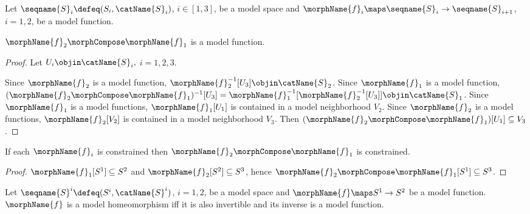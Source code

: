 \documentclass{article}
\begin{document}
\begin{lemma}
\label{lem:modcomp}
Let $\seqname{S}_i \defeq (S_i,\catName{S}_i)$, $i \in [1,3]$, be a
model space and
$\morphName{f}_i \maps \seqname{S}_i \to \seqname{S}_{i+1}$, $i=1,2$, be
a model function.

$\morphName{f}_2 \morphCompose \morphName{f}_1$ is a model function.

\begin{proof}
Let $U_i \objin \catName{S}_i,$ $i=1,2,3$.

Since $\morphName{f}_2$ is a model function,
\nobreaks
  {{
    $\morphName{f}^{-1}_2[U_3] \objin \catName{S}_2$.
  }}
Since $\morphName{f}_1$ is a model function,
$
  (\morphName{f}_2 \morphCompose \morphName{f}_1)^{-1}[U_3]
  =
  \morphName{f}^{-1}_1[\morphName{f}^{-1}_2[U_3]]
  \objin
  \catName{S}_1
$.
Since $\morphName{f}_1$ is a model functions, $\morphName{f}_1[U_1]$
is contained in a model neighborhood $V_2$.
Since $\morphName{f}_2$ is a model functions, $\morphName{f}_2[V_2]$
is contained in a model neighborhood $V_3$.
Then $(\morphName{f}_2 \morphCompose \morphName{f}_1)[U_1] \subseteq V_3$.
\end{proof}

If each $\morphName{f}_i$ is constrained then
$\morphName{f}_2 \morphCompose \morphName{f}_1$ is constrained.

\begin{proof}
$\morphName{f}_1[S^1] \subseteq S^2$ and
$\morphName{f}_2[S^2] \subseteq S^3$, hence
$\morphName{f}_2 \morphCompose \morphName{f}_1[S^1] \subseteq S^3$.
\end{proof}
\end{lemma}

\begin{definition}
\label{def:modelhomeo}
Let $\seqname{S}^i \defeq (S^i, \catName{S}^i)$, $i=1,2$, be a model
space and $\morphName{f} \maps S^1 \to S^2$ be a model function.
$\morphName{f}$ is a model homeomorphism iff it is also invertible and
its inverse is a model function.
\end{definition}
\end{document}
